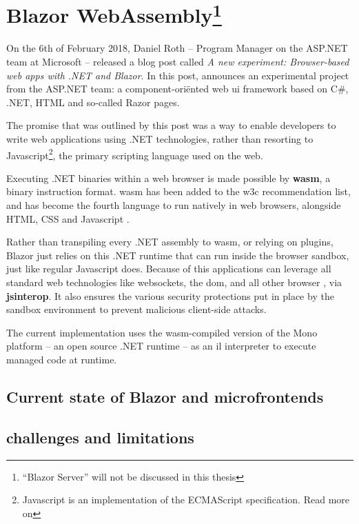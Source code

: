 \section[Blazor WebAssembly]{Blazor WebAssembly\footnote{``Blazor Server'' will
not be discussed in this thesis}}

On the 6th of February 2018, Daniel Roth -- Program Manager on the ASP.NET team
at Microsoft -- released a blog post called \textit{A new experiment:
Browser-based web apps with .NET and Blazor}. In this post, \textcite{Roth_2018}
announces an experimental project from the ASP.NET team: a component-ori\"ented
web \gls{ui} framework based on C\#, .NET, HTML and so-called Razor pages. 

The promise that was outlined by this post was a way to enable developers to
write web applications using .NET technologies, rather than resorting to
Javascript\footnote{Javascript is an implementation of the ECMAScript
specification. Read more on }, the
primary scripting language used on the web.

Executing .NET binaries within a web browser is made possible by
\textbf{\gls{wasm}}, a binary instruction format.
\Gls{wasm} has been added to the \gls{w3c} recommendation list, and has become
the fourth language to run natively in web browsers, alongside HTML, CSS and
Javascript \autocite{Couriol_2019}. 

Rather than \gls{transpiling} every .NET assembly to \gls{wasm}, or relying on
plugins, Blazor just relies on this .NET runtime that can run inside the browser
sandbox, just like regular Javascript does. Because of this applications can
leverage all standard web technologies like websockets, the \gls{dom}, and all
other browser , via \textbf{\gls{jsinterop}}. It also ensures the
various security protections put in place by the sandbox environment to prevent
malicious client-side attacks.

The current implementation uses the \gls{wasm}-compiled version of the
Mono platform -- an open source .NET
runtime -- as an \gls{il} interpreter to execute managed code at runtime.






\subsection{Current state of Blazor and microfrontends}
\subsection{challenges and limitations}